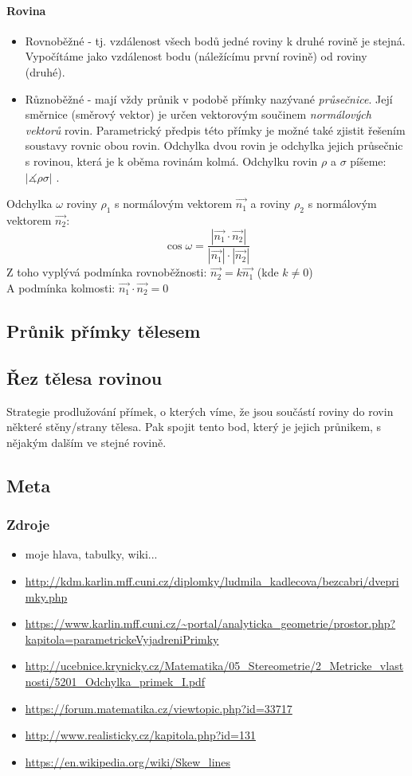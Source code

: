 \documentclass[12pt]{article}
\begin{document}
\paragraph{Rovina}
\begin{itemize}
\item Rovnoběžné - tj. vzdálenost všech bodů jedné roviny k druhé rovině je stejná. Vypočítáme jako vzdálenost bodu (náležícímu první rovině) od roviny (druhé).
\item Různoběžné - mají vždy průnik v podobě přímky nazývané \emph{průsečnice}. Její směrnice (směrový vektor) je určen vektorovým součinem \emph{normálových vektorů} rovin. Parametrický předpis této přímky je možné také zjistit řešením soustavy rovnic obou rovin. Odchylka dvou rovin je odchylka jejich průsečnic s rovinou, která je k oběma rovinám kolmá. Odchylku rovin $\rho$ a $\sigma$ píšeme: $| \measuredangle  \rho \sigma|$ .
\end{itemize}
Odchylka $\omega$ roviny $\rho_1$ s normálovým vektorem $\vec{n_1}$ a roviny $\rho_2$ s normálovým vektorem $\vec{n_2}$:
\begin{equation}
\cos \omega = \frac{|\vec{n_1}\cdot\vec{n_2}|}{|\vec{n_1}|\cdot|\vec{n_2}|}
\end{equation}
Z toho vyplývá podmínka rovnoběžnosti: $\vec{n_2} = k \vec{n_1}$ (kde $k \neq 0$)\\
A podmínka kolmosti: $\vec{n_1} \cdot \vec{n_2} = 0$
\subsection{Průnik přímky tělesem}
\subsection{Řez tělesa rovinou}
Strategie prodlužování přímek, o kterých víme, že jsou součástí roviny do rovin některé stěny/strany tělesa. Pak spojit tento bod, který je jejich průnikem, s nějakým dalším ve stejné rovině.
\subsection{Meta}
\subsubsection{Zdroje}
\begin{itemize}
\item moje hlava, tabulky, wiki...	
\item \url{http://kdm.karlin.mff.cuni.cz/diplomky/ludmila_kadlecova/bezcabri/dveprimky.php}
\item \url{https://www.karlin.mff.cuni.cz/~portal/analyticka_geometrie/prostor.php?kapitola=parametrickeVyjadreniPrimky}
\item \url{http://ucebnice.krynicky.cz/Matematika/05_Stereometrie/2_Metricke_vlastnosti/5201_Odchylka_primek_I.pdf}
\item \url{https://forum.matematika.cz/viewtopic.php?id=33717}
\item \url{http://www.realisticky.cz/kapitola.php?id=131}
\item \url{https://en.wikipedia.org/wiki/Skew_lines}
\end{itemize}
\end{document}
